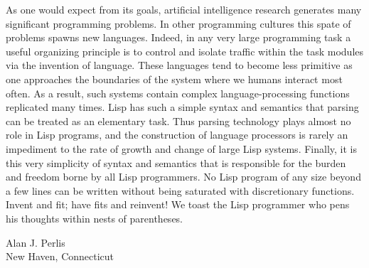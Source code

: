 As one would expect from its goals, artificial intelligence research
generates many significant programming problems.  In other
programming cultures this spate of problems spawns new languages.
Indeed, in any very large programming task a useful organizing
principle is to control and isolate traffic within the task modules
via the invention of language.  These languages tend to become less
primitive as one approaches the boundaries of the system where we
humans interact most often.  As a result, such systems contain complex
language-processing functions replicated many times.  Lisp has such a
simple syntax and semantics that parsing can be treated as an
elementary task.  Thus parsing technology plays almost no role in Lisp
programs, and the construction of language processors is rarely an
impediment to the rate of growth and change of large Lisp systems.
Finally, it is this very simplicity of syntax and semantics that is
responsible for the burden and freedom borne by all Lisp programmers.
No Lisp program of any size beyond a few lines can be written without
being saturated with discretionary functions.  Invent and fit; have
fits and reinvent!  We toast the Lisp programmer who pens his thoughts
within nests of parentheses.

Alan J. Perlis\\
New Haven, Connecticut

